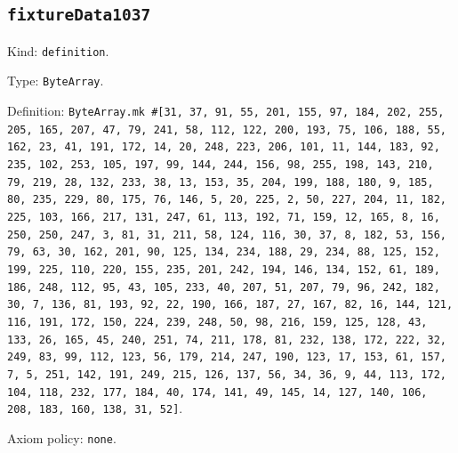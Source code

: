 \documentclass[11pt]{article}
\begin{document}
\subsection*{\texttt{fixtureData1037}}
\noindent Kind: \texttt{definition}.\par
\noindent Type: \texttt{ByteArray}.\par
\noindent Definition: \texttt{ByteArray.mk \#[31, 37, 91, 55, 201, 155, 97, 184, 202, 255, 205, 165, 207, 47, 79, 241, 58, 112, 122, 200, 193, 75, 106, 188, 55, 162, 23, 41, 191, 172, 14, 20, 248, 223, 206, 101, 11, 144, 183, 92, 235, 102, 253, 105, 197, 99, 144, 244, 156, 98, 255, 198, 143, 210, 79, 219, 28, 132, 233, 38, 13, 153, 35, 204, 199, 188, 180, 9, 185, 80, 235, 229, 80, 175, 76, 146, 5, 20, 225, 2, 50, 227, 204, 11, 182, 225, 103, 166, 217, 131, 247, 61, 113, 192, 71, 159, 12, 165, 8, 16, 250, 250, 247, 3, 81, 31, 211, 58, 124, 116, 30, 37, 8, 182, 53, 156, 79, 63, 30, 162, 201, 90, 125, 134, 234, 188, 29, 234, 88, 125, 152, 199, 225, 110, 220, 155, 235, 201, 242, 194, 146, 134, 152, 61, 189, 186, 248, 112, 95, 43, 105, 233, 40, 207, 51, 207, 79, 96, 242, 182, 30, 7, 136, 81, 193, 92, 22, 190, 166, 187, 27, 167, 82, 16, 144, 121, 116, 191, 172, 150, 224, 239, 248, 50, 98, 216, 159, 125, 128, 43, 133, 26, 165, 45, 240, 251, 74, 211, 178, 81, 232, 138, 172, 222, 32, 249, 83, 99, 112, 123, 56, 179, 214, 247, 190, 123, 17, 153, 61, 157, 7, 5, 251, 142, 191, 249, 215, 126, 137, 56, 34, 36, 9, 44, 113, 172, 104, 118, 232, 177, 184, 40, 174, 141, 49, 145, 14, 127, 140, 106, 208, 183, 160, 138, 31, 52]}.\par
\noindent Axiom policy: \texttt{none}.\par
\end{document}
